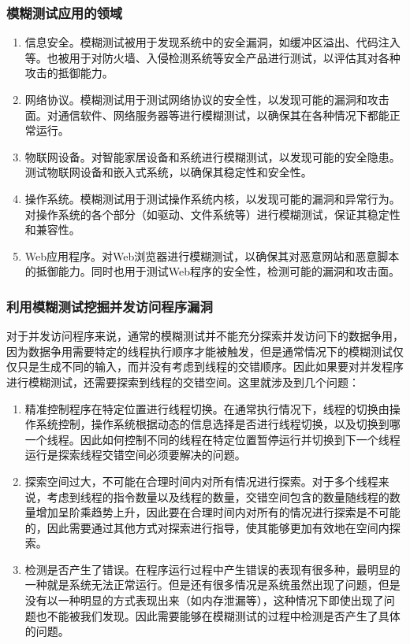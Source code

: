 \subsubsection{模糊测试应用的领域}

\begin{enumerate}
\item 信息安全。模糊测试被用于发现系统中的安全漏洞，如缓冲区溢出、代码注入等。也被用于对防火墙、入侵检测系统等安全产品进行测试，以评估其对各种攻击的抵御能力。
\item 网络协议。模糊测试用于测试网络协议的安全性，以发现可能的漏洞和攻击面。对通信软件、网络服务器等进行模糊测试，以确保其在各种情况下都能正常运行。
\item 物联网设备。对智能家居设备和系统进行模糊测试，以发现可能的安全隐患。测试物联网设备和嵌入式系统，以确保其稳定性和安全性。
\item 操作系统。模糊测试用于测试操作系统内核，以发现可能的漏洞和异常行为。对操作系统的各个部分（如驱动、文件系统等）进行模糊测试，保证其稳定性和兼容性。
\item Web应用程序。对Web浏览器进行模糊测试，以确保其对恶意网站和恶意脚本的抵御能力。同时也用于测试Web程序的安全性，检测可能的漏洞和攻击面。
\end{enumerate}

\subsubsection{利用模糊测试挖掘并发访问程序漏洞}

对于并发访问程序来说，通常的模糊测试并不能充分探索并发访问下的数据争用，因为数据争用需要特定的线程执行顺序才能被触发，但是通常情况下的模糊测试仅仅只是生成不同的输入，而并没有考虑到线程的交错顺序。因此如果要对并发程序进行模糊测试，还需要探索到线程的交错空间。这里就涉及到几个问题：

\begin{enumerate}
\item 精准控制程序在特定位置进行线程切换。在通常执行情况下，线程的切换由操作系统控制，操作系统根据动态的信息选择是否进行线程切换，以及切换到哪一个线程。因此如何控制不同的线程在特定位置暂停运行并切换到下一个线程运行是探索线程交错空间必须要解决的问题。
\item 探索空间过大，不可能在合理时间内对所有情况进行探索。对于多个线程来说，考虑到线程的指令数量以及线程的数量，交错空间包含的数量随线程的数量增加呈阶乘趋势上升，因此要在合理时间内对所有的情况进行探索是不可能的，因此需要通过其他方式对探索进行指导，使其能够更加有效地在空间内探索。
\item 检测是否产生了错误。在程序运行过程中产生错误的表现有很多种，最明显的一种就是系统无法正常运行。但是还有很多情况是系统虽然出现了问题，但是没有以一种明显的方式表现出来（如内存泄漏等），这种情况下即使出现了问题也不能被我们发现。因此需要能够在模糊测试的过程中检测是否产生了具体的问题。
\end{enumerate}

